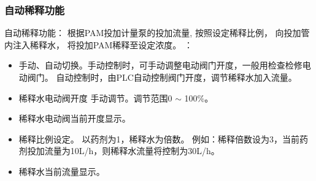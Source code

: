 
\subsubsection{自动稀释功能}
    自动稀释功能：
    根据PAM投加计量泵的投加流量,
    按照设定稀释比例，
    向投加管内注入稀释水，
    将投加PAM稀释至设定浓度。
    ：
    \begin{itemize}
        \item 手动、自动切换。手动控制时，可手动调整电动阀门开度，一般用检查检修电动阀门。
            自动控制时，由PLC自动控制阀门开度，调节稀释水加入流量。
        \item 稀释水电动阀开度 手动调节。调节范围0 $\sim$ 100\%。
        \item 稀释水电动阀当前开度显示。
        \item 稀释比例设定。
            以药剂为1，稀释水为倍数。
            例如：稀释倍数设为3，当前药剂投加流量为10L/h，则稀释水流量将控制为30L/h。
        \item 稀释水当前流量显示。
     \end{itemize}
